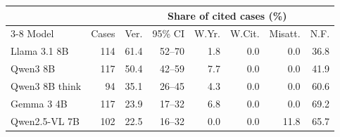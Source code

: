 \begin{tabular}{lrrrrrrr}
\toprule
& & \multicolumn{6}{c}{Share of cited cases (\%)} \\
\cmidrule(lr){3-8}
Model & Cases & Ver. & 95\% CI & W.Yr. & W.Cit. & Misatt. & N.F. \\
\midrule
Llama 3.1 8B & 114 & 61.4 & 52--70 & 1.8 & 0.0 & 0.0 & 36.8 \\
Qwen3 8B & 117 & 50.4 & 42--59 & 7.7 & 0.0 & 0.0 & 41.9 \\
Qwen3 8B think & 94 & 35.1 & 26--45 & 4.3 & 0.0 & 0.0 & 60.6 \\
Gemma 3 4B & 117 & 23.9 & 17--32 & 6.8 & 0.0 & 0.0 & 69.2 \\
Qwen2.5-VL 7B & 102 & 22.5 & 16--32 & 0.0 & 0.0 & 11.8 & 65.7 \\
\bottomrule
\end{tabular}
